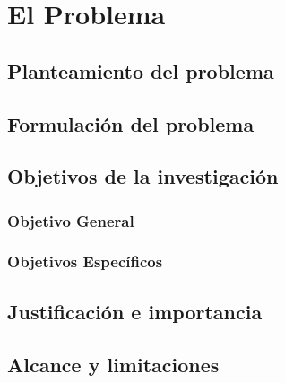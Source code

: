 \chapter{El Problema} %
\section{Planteamiento del problema}
\lipsum[7]
\section{Formulación del problema}
\lipsum[8]
\section{Objetivos de la investigación}
\subsection{Objetivo General}
\lipsum[9]
\subsection{Objetivos Específicos}
\lipsum[10]
\section{Justificación e importancia}
\lipsum[11]
\section{Alcance y limitaciones}
\lipsum[12]

